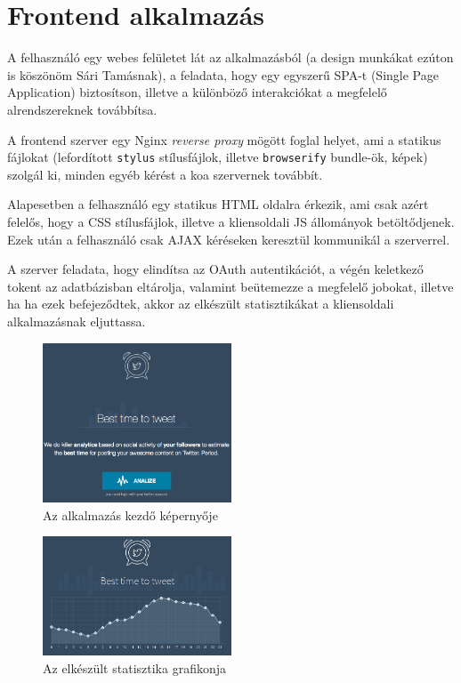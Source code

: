 \section{Frontend alkalmazás}

A felhasználó egy webes felületet lát az alkalmazásból (a design munkákat
ezúton is köszönöm Sári Tamásnak),
a feladata, hogy egy egyszerű SPA-t (Single Page Application) biztosítson,
illetve a különböző interakciókat a megfelelő alrendszereknek továbbítsa.

A frontend szerver egy Nginx \emph{reverse proxy} mögött foglal helyet,
ami a statikus fájlokat (lefordított \verb=stylus= stílusfájlok, illetve
\verb=browserify= bundle-ök, képek) szolgál ki, minden egyéb kérést
a koa szervernek továbbít.

Alapesetben a felhasználó egy statikus HTML oldalra érkezik,
ami csak azért felelős, hogy a CSS stílusfájlok, illetve a kliensoldali JS
állományok betöltődjenek. Ezek után a felhasználó csak AJAX kéréseken keresztül
kommunikál a szerverrel.

A szerver feladata, hogy elindítsa az OAuth autentikációt, a végén keletkező
tokent az adatbázisban eltárolja, valamint beütemezze a megfelelő jobokat,
illetve ha ha ezek befejeződtek, akkor az elkészült statisztikákat
a kliensoldali alkalmazásnak eljuttassa.

\begin{figure}[h!]
  \centering
  \includegraphics[width=0.5\textwidth]{figures/frontend-1}
  \caption{Az alkalmazás kezdő képernyője}
  \label{fig:frontend-1}
\end{figure}

\begin{figure}[h!]
  \centering
  \includegraphics[width=0.5\textwidth]{figures/frontend-2}
  \caption{Az elkészült statisztika grafikonja}
  \label{fig:frontend-1}
\end{figure}
